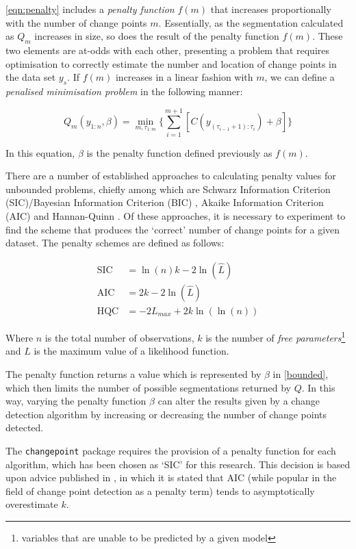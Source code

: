 \documentclass[../main.tex]{subfiles}
\begin{document}
\autoref{eqn:penalty} includes a \emph{penalty function} $f(m)$ that increases proportionally with the number of change points $m$. Essentially, as the segmentation calculated as $Q_m$ increases in size, so does the result of the penalty function $f(m)$. These two elements are at-odds with each other, presenting a problem that requires optimisation to correctly estimate the number and location of change points in the data set $y_s$. If $f(m)$ increases in a linear fashion with $m$, we can define a \emph{penalised minimisation problem} in the following manner:

\begin{equation}
\label{bounded}
    Q_m(y_{1:n}, \beta) = \min_{m,\tau_{1:m}} \Bigg\{ \sum^{m+1}_{i=1}[C(y_{(\tau_{i - 1} + 1):\tau_i}) + \beta] \Bigg\}
\end{equation}

In this equation, $\beta$ is the penalty function defined previously as $f(m)$.

There are a number of established approaches to calculating penalty values for unbounded problems, chiefly among which are Schwarz Information Criterion (SIC)/Bayesian Information Criterion (BIC) \cite{Schwarz1978}, Akaike Information Criterion (AIC) \cite{Akaike1974} and Hannan-Quinn \cite{Journal2009}. Of these approaches, it is necessary to experiment to find the scheme that produces the `correct' number of change points for a given dataset. The penalty schemes are defined as follows:

\begin{align}
    \text{SIC} &= \ln(n) k - 2 \ln(\hat{L})\\
    \text{AIC} &= 2k - 2 \ln(\hat{L})\\
    \text{HQC} &= -2L_{max} + 2k \ln(\ln(n))
\end{align}

Where $n$ is the total number of observations, $k$ is the number of \emph{free parameters}\footnote{variables that are unable to be predicted by a given model} and $\hat{L}$ is the maximum value of a likelihood function.

The penalty function returns a value which is represented by $\beta$ in \autoref{bounded}, which then limits the number of possible segmentations returned by $Q$. In this way, varying the penalty function $\beta$ can alter the results given by a change detection algorithm by increasing or decreasing the number of change points detected.

The \texttt{changepoint} package requires the provision of a penalty function for each algorithm, which has been chosen as `SIC' for this research. This decision is based upon advice published in \cite{Eckley2011}, in which it is stated that AIC (while popular in the field of change point detection as a penalty term) tends to asymptotically overestimate $k$.
\end{document}
